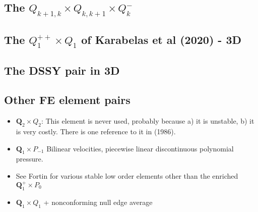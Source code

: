 \subsection{The $Q_{k+1,k}\times Q_{k,k+1} \times Q_{k}^-$ \label{ss:qqq_elt}}


\subsection{The $Q_1^{++} \times Q_1$ of Karabelas et al (2020) - 3D} \label{ss:Q1Q1bb_3D}


\subsection{The DSSY pair in 3D} \label{ss:dssy_3D}


\subsection{Other FE element pairs}

\begin{itemize}

\item ${\bm Q}_2\times Q_2$: This element is never used, probably because 
a) it is unstable, b) it is very costly. 
There is one reference to it in \textcite{hufb86} (1986).

\item ${\bm Q}_1\times P_{-1}$ Bilinear velocities,  piecewise linear discontinuous polynomial pressure.

\item See Fortin \cite{fort81} for various stable low order elements other than the enriched 
${\bm Q}_1^+ \times P_0$

\item ${\bm Q}_1\times Q_1$ + nonconforming null edge average \cite{fros07}

\end{itemize}



